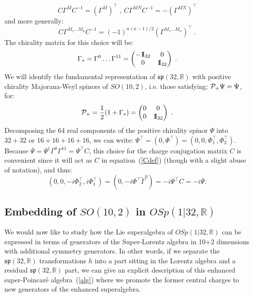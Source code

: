 \documentclass[a4paper,11pt]{article}
\def\Id{{\rm 1\kern-.28em I}}
\begin{document}
\begin{equation}\label{CGam}
C \Gamma^M C^{-1} = (\Gamma^M)^{\top} \text{  ,  }
C \Gamma^{MN} C^{-1} = -(\Gamma^{MN})^{\top}
\end{equation}
and more generally:
\begin{equation}\label{CGamn}
C \Gamma^{M_1 \ldots M_n} C^{-1} = (-1)^{n(n-1)/2} (\Gamma^{M_1 \ldots M_n})^{\top}\; .
\end{equation}
The chirality matrix for this choice will be:
$$
\Gamma_* =  \Gamma^0 \ldots \Gamma^{11} = \begin{pmatrix}
-\Id_{32} & 0 \\
0 & \Id_{32} 
\end{pmatrix}\; .
$$
We will identify the fundamental representation of $\mathfrak{sp}(32,\mathbb{R})$ with positive 
chirality Majorana-Weyl spinors of $SO(10,2)$, i.e. those satisfying: ${\cal P}_+ \Psi = \Psi$, for:
$$
{\cal P}_+ = \frac{1}{2} (1 + \Gamma_*) =
\begin{pmatrix}
0 & 0 \\
0 & \Id_{32}
\end{pmatrix}\; .
$$
Decomposing the 64 real components of the positive chirality spinor $\Psi$ into $32+32$ or $16+16+16+16$, we can write:
$\Psi^{\top} = (0,\Phi^{\top}) = (0,0,\Phi_1^{\top}, \Phi_2^{\top})$. 
Because $\overline{\Psi}=\Psi^{\dagger} \Gamma^0 \Gamma^{11} = \Psi^{\top} C$,
this choice for the charge conjugation matrix $C$ is convenient since it will
act as $C$ in equation~(\ref{Cdef}) (though with a slight abuse of notation), and thus:
$$
(0,0,-i\Phi_2^{\top}, i\Phi_1^{\top}) = (0,-i \Phi^{\top} \tilde{\Gamma}^0) = -i \Psi^{\top} C = -i \overline{\Psi}.
$$

\subsection{Embedding of $SO(10,2)$ in $OSp(1|32,\mathbb{R})$}
We would now like to study how the Lie superalgebra of $OSp(1|32,\mathbb{R})$ 
can be expressed in terms of generators of the Super-Lorentz
algebra in 10+2 dimensions with additional symmetry generators. 
In other words, if we separate the $\mathfrak{sp}(32,\mathbb{R})$ 
transformations $h$ into a part sitting in the Lorentz algebra 
and a residual  $\mathfrak{sp}(32,\mathbb{R})$ part, we can give an
explicit description of this enhanced super-Poincar\'e algebra~(\ref{alg}) 
where we promote the former central charges to new generators of the
enhanced superalgebra.  
\end{document}
